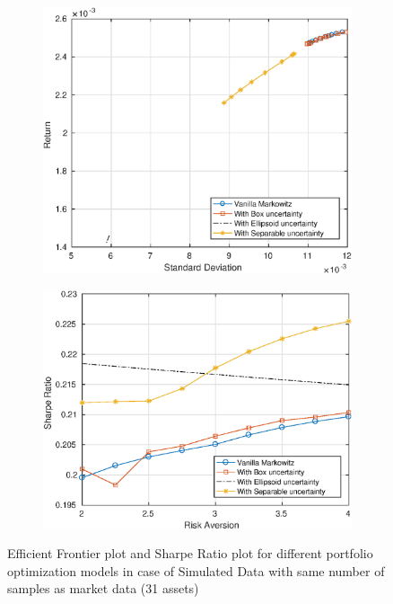 \documentclass[12pt]{article}
\numberwithin{equation}{section}
\begin{document}
\begin{figure}[h]
\centering
\begin{subfigure}{.5\textwidth}
  \centering
  \includegraphics[width=.8\linewidth]{30_ef_ideal_range_exact_sim.eps}
\end{subfigure}%
\begin{subfigure}{.5\textwidth}
  \centering
  \includegraphics[width=.8\linewidth]{30_sr_ideal_range_exact_sim.eps}
\end{subfigure}
\caption{Efficient Frontier plot and Sharpe Ratio plot for different portfolio optimization models in case of Simulated Data with same number of samples as market data (31 assets)}
\label{fig:2}
\end{figure}
\end{document}
